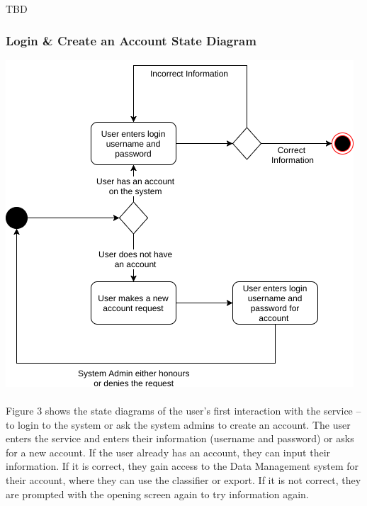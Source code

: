 \documentclass[12pt,oneside,letterpaper]{article}
\begin{document}
TBD

\subsubsection{Login \& Create an Account State Diagram}
\includegraphics[scale = 0.7]{Veazey_Login_State.png}
\begingroup
{}
\endgroup

\paragraph{} Figure 3 shows the state diagrams of the user's first interaction with the service -- to login to the system or ask the system admins to create an account. The user enters the service and enters their information (username and password) or asks for a new account. If the user already has an account, they can input their information. If it is correct, they gain access to the Data Management system for their account, where they can use the classifier or export. If it is not correct, they are prompted with the opening screen again to try information again.
\end{document}
